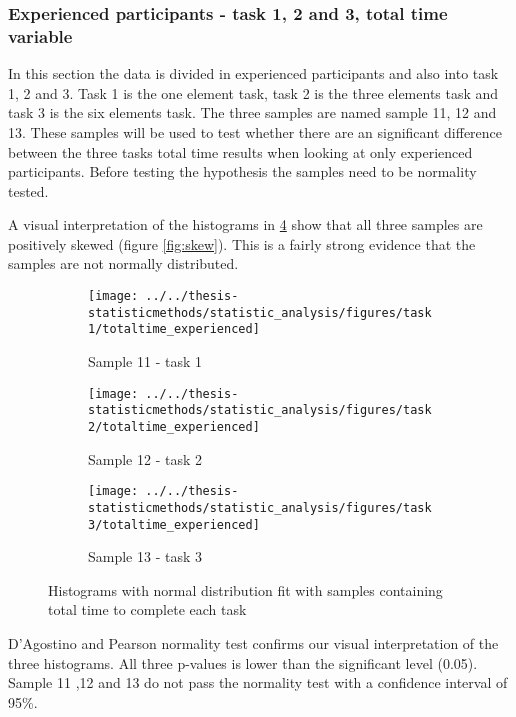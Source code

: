 \vspace{0.4cm}

\subsubsection[Sample 11, 12 and 13]{Experienced participants - task 1, 2 and 3, total time variable}
 In this section the data is divided in experienced participants and also into task 1, 2 and 3. Task 1 is the one element task, task 2 is the three elements task and task 3 is the six elements task. The three samples are named sample 11, 12 and 13. These samples will be used to test whether there are an significant difference between the three tasks total time results when looking at only experienced participants. Before testing the hypothesis the samples need to be normality tested. 
 
  A visual interpretation of the histograms in \ref{fig:sample11_12_13_histogram} show that all three samples are positively skewed (figure \ref{fig:skew}). This is a fairly strong evidence that the samples are not normally distributed.
 
 \begin{figure}[H]
 	\centering
	 \begin{subfigure}[b]{0.32\textwidth}
	 	\centering
	 	\texttt{[image: ../../thesis-statisticmethods/statistic\_analysis/figures/task1/totaltime\_experienced]}
	 	\caption{Sample 11 - task 1}
	 	\label{fig:totaltimeexperienced_task1}
	 \end{subfigure}
	 \begin{subfigure}[b]{0.32\textwidth}
	 	\centering
	 	\texttt{[image: ../../thesis-statisticmethods/statistic\_analysis/figures/task2/totaltime\_experienced]}
	 	\caption{Sample 12 - task 2}
	 	\label{fig:totaltimeexperienced_task2}
	 \end{subfigure}
	 \begin{subfigure}[b]{0.32\textwidth}
	 	\centering
	 	\texttt{[image: ../../thesis-statisticmethods/statistic\_analysis/figures/task3/totaltime\_experienced]}
	 	\caption{Sample 13 - task 3}
	 	\label{fig:totaltimeexperienced}
	 \end{subfigure}
 	\caption{Histograms with normal distribution fit with samples containing total time to complete each task}
 	\label{fig:sample11_12_13_histogram}
 \end{figure}
 
  D'Agostino and Pearson normality test confirms our visual interpretation of the three histograms. All three p-values is lower than the significant level (0.05). Sample 11 ,12 and 13 do not pass the normality test with a confidence interval of 95\%. 
 
